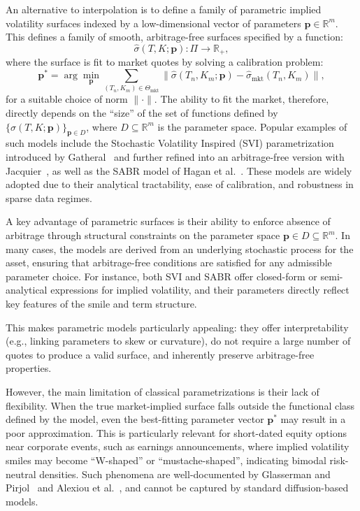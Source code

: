 An alternative to interpolation is to define a family of parametric implied volatility surfaces indexed by a low-dimensional vector of parameters $\mathbf{p} \in \mathbb{R}^m$.
This defines a family of smooth, arbitrage-free surfaces specified by a function:
\[
    \hat{\sigma}(T, K; \mathbf{p}): \Pi \to \mathbb{R}_+,
\]
where the surface is fit to market quotes by solving a calibration problem:
\[
    \mathbf{p}^* = \arg\min_{\mathbf{p}} \sum_{(T_n, K_m) \in \Theta_{\text{mkt}}} \| \hat{\sigma}(T_n, K_m; \mathbf{p}) - \hat{\sigma}_{\text{mkt}}(T_n, K_m) \|,
\]
for a suitable choice of norm $\|\cdot\|$.
The ability to fit the market, therefore, directly depends on the “size” of the set of functions defined by $\{\hat{\sigma}(T, K; \mathbf{p})\}_{\mathbf{p} \in D}$, where $D \subseteq \mathbb{R}^m$ is the parameter space.
Popular examples of such models include the Stochastic Volatility Inspired (SVI) parametrization introduced by Gatheral~\cite{gatheral2011volatility} and further refined into an arbitrage-free version with Jacquier~\cite{gatheral2014arbitrage}, as well as the SABR model of Hagan et al.~\cite{hagan2002managing}.
These models are widely adopted due to their analytical tractability, ease of calibration, and robustness in sparse data regimes.

A key advantage of parametric surfaces is their ability to enforce absence of arbitrage through structural constraints on the parameter space $\mathbf{p} \in D \subseteq \mathbb{R}^m$.
In many cases, the models are derived from an underlying stochastic process for the asset, ensuring that arbitrage-free conditions are satisfied for any admissible parameter choice.
For instance, both SVI and SABR offer closed-form or semi-analytical expressions for implied volatility, and their parameters directly reflect key features of the smile and term structure.

This makes parametric models particularly appealing: they offer interpretability (e.g., linking parameters to skew or curvature), do not require a large number of quotes to produce a valid surface, and inherently preserve arbitrage-free properties.

However, the main limitation of classical parametrizations is their lack of flexibility.
When the true market-implied surface falls outside the functional class defined by the model, even the best-fitting parameter vector $\mathbf{p}^*$ may result in a poor approximation.
This is particularly relevant for short-dated equity options near corporate events, such as earnings announcements, where implied volatility smiles may become ``W-shaped'' or ``mustache-shaped'', indicating bimodal risk-neutral densities.
Such phenomena are well-documented by Glasserman and Pirjol~\cite{glasserman2023w} and Alexiou et al.~\cite{alexiou2023pricing}, and cannot be captured by standard diffusion-based models.

